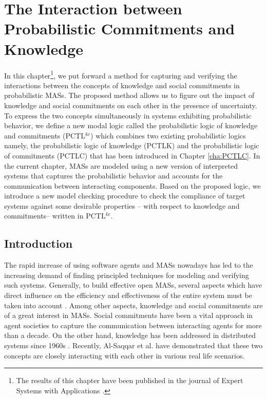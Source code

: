 \setcounter{chapter}{3}

\chapter{The Interaction between Probabilistic Commitments and Knowledge}\label{cha:PCTLKC}


In this chapter\footnote{The results of this chapter have been published in the journal of Expert Systems with Applications \cite{Sultan2014b}.}, we
put forward a method for capturing and verifying the interactions between the concepts of knowledge and social commitments in probabilistic MASs. The proposed method allows us to figure out the impact of knowledge and social commitments on each other in the presence of uncertainty. To express the two concepts simultaneously in systems exhibiting probabilistic behavior, we define a new modal logic called the probabilistic logic of knowledge and commitments (PCTL$^{kc}$) which combines two existing probabilistic logics namely, the probabilistic logic of knowledge (PCTLK) \cite{Wan2012,Wan2013} and the probabilistic logic of commitments (PCTLC) that has been introduced in Chapter \ref{cha:PCTLC}. In the current chapter, MASs are modeled using a new version of interpreted systems that captures the probabilistic behavior and accounts for the communication between interacting components. Based on the proposed logic, we introduce a new model checking procedure to check the compliance of target systems against some desirable properties -- with respect to knowledge and commitments-- written in PCTL$^{kc}$. %

\section{Introduction} \label{Introduction}

The rapid increase of using software agents and MASs nowadays has led to the increasing demand of finding principled techniques for modeling and verifying such systems. Generally, to build effective open MASs, several aspects which have direct influence on the efficiency and effectiveness of
the entire system must be taken into account \cite{Konur2013}.
Among other aspects, knowledge and social commitments are of a great
interest in MASs. Social commitments have been a vital approach in agent societies to capture the communication between interacting agents for more than a decade. On the other hand, knowledge has been addressed in distributed systems since 1960s \cite{Wan2013}. Recently, Al-Saqqar et al. \cite{Al-Saqqar2014a} have demonstrated that these two concepts are closely interacting with each other in various real life scenarios.

